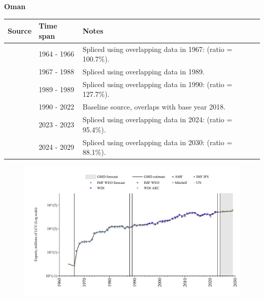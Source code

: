 \documentclass[12pt,a4paper,landscape]{article}
\begin{document}
\begin{adjustbox}{max totalsize={\paperwidth}{\paperheight},center}
\begin{minipage}[t][\textheight][t]{\textwidth}
\vspace*{0.5cm}
{}
\begin{center}
{\Large\bfseries Oman}
\end{center}
\vspace{0.5cm}
\begin{table}[H]
\centering
\small
\begin{tabular}{|l|l|l|}
\hline
\textbf{Source} & \textbf{Time span} & \textbf{Notes} \\
\hline
\rowcolor{white}\cite{Mitchell}& 1964 - 1966 &Spliced using overlapping data in 1967: (ratio = 100.7\%).\\
\rowcolor{lightgray}\cite{WDI}& 1967 - 1988 &Spliced using overlapping data in 1989.\\
\rowcolor{white}\cite{UN}& 1989 - 1989 &Spliced using overlapping data in 1990: (ratio = 127.7\%).\\
\rowcolor{lightgray}\cite{WDI}& 1990 - 2022 &Baseline source, overlaps with base year 2018.\\
\rowcolor{white}\cite{IMF_IFS}& 2023 - 2023 &Spliced using overlapping data in 2024: (ratio = 95.4\%).\\
\rowcolor{lightgray}\cite{IMF_WEO_forecast}& 2024 - 2029 &Spliced using overlapping data in 2030: (ratio = 88.1\%).\\
\hline
\end{tabular}
\end{table}
\begin{figure}[H]
\centering
\includegraphics[width=\textwidth,height=0.6\textheight,keepaspectratio]{graphs/OMN_exports.pdf}
\end{figure}
\end{minipage}
\end{adjustbox}
\end{document}
